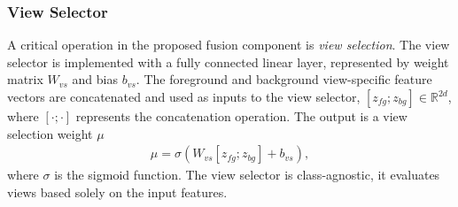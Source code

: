 \subsubsection{View Selector}
A critical operation in the proposed fusion component is \emph{view selection}. The view selector is implemented with a fully connected linear layer, represented by weight matrix $W_{vs}$ and bias $b_{vs}$. The foreground and background view-specific feature vectors are concatenated and used as inputs to the view selector, $[z_{fg}; z_{bg}] \in \mathbb{R}^{2d}$, where $[\cdot ; \cdot]$ represents the concatenation operation. The output is a view selection weight $\mu$
\begin{equation}
\begin{aligned}
    \mu = \sigma(W_{vs} [z_{fg}; z_{bg}] + b_{vs}),
\end{aligned}
\end{equation}
where $\sigma$ is the sigmoid function. The view selector is class-agnostic, it evaluates views based solely on the input features.

